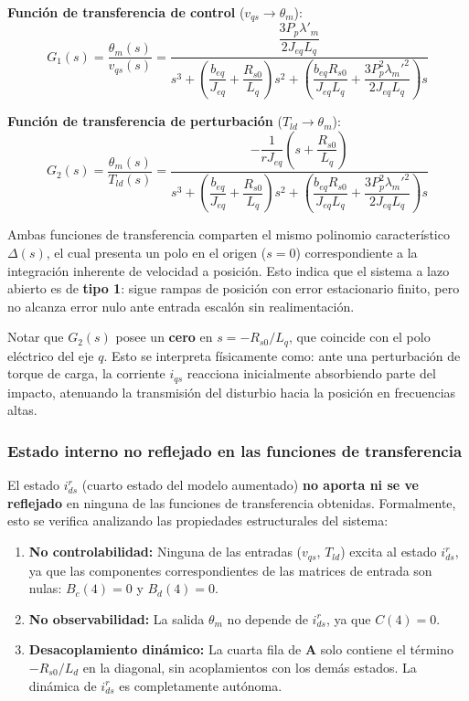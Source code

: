 \documentclass[12pt, a4paper,journal, onecolumn, compsoc]{IEEEtran}
\begin{document}
\vspace{0.3cm}
\textbf{Función de transferencia de control} ($v_{qs} \to \theta_m$):
\begin{equation} \label{eq:tf_vqs}
\boxed{
    G_1(s) = \frac{\theta_m(s)}{v_{qs}(s)} = \frac{\dfrac{3 P_p \lambda'_m}{2 J_{eq} L_q}}{s^3 + \left(\dfrac{b_{eq}}{J_{eq}} + \dfrac{R_{s0}}{L_q}\right)s^2 + \left(\dfrac{b_{eq} R_{s0}}{J_{eq} L_q} + \dfrac{3 P_p^2 \lambda_m'^2}{2 J_{eq} L_q}\right)s}
}
\end{equation}

\vspace{0.3cm}
\textbf{Función de transferencia de perturbación} ($T_{ld} \to \theta_m$):
\begin{equation} \label{eq:tf_Tld}
\boxed{
    G_2(s) = \frac{\theta_m(s)}{T_{ld}(s)} = \frac{-\dfrac{1}{r J_{eq}}\left(s + \dfrac{R_{s0}}{L_q}\right)}{s^3 + \left(\dfrac{b_{eq}}{J_{eq}} + \dfrac{R_{s0}}{L_q}\right)s^2 + \left(\dfrac{b_{eq} R_{s0}}{J_{eq} L_q} + \dfrac{3 P_p^2 \lambda_m'^2}{2 J_{eq} L_q}\right)s}
}
\end{equation}

Ambas funciones de transferencia comparten el mismo polinomio característico $\Delta(s)$, el cual presenta un polo en el origen ($s=0$) correspondiente a la integración inherente de velocidad a posición. Esto indica que el sistema a lazo abierto es de \textbf{tipo 1}: sigue rampas de posición con error estacionario finito, pero no alcanza error nulo ante entrada escalón sin realimentación.

Notar que $G_2(s)$ posee un \textbf{cero} en $s = -R_{s0}/L_q$, que coincide con el polo eléctrico del eje $q$. Esto se interpreta físicamente como: ante una perturbación de torque de carga, la corriente $i_{qs}$ reacciona inicialmente absorbiendo parte del impacto, atenuando la transmisión del disturbio hacia la posición en frecuencias altas.

\subsubsection{Estado interno no reflejado en las funciones de transferencia}
El estado $i_{ds}^r$ (cuarto estado del modelo aumentado) \textbf{no aporta ni se ve reflejado} en ninguna de las funciones de transferencia obtenidas. Formalmente, esto se verifica analizando las propiedades estructurales del sistema:

\begin{enumerate}
    \item \textbf{No controlabilidad:} Ninguna de las entradas ($v_{qs}$, $T_{ld}$) excita al estado $i_{ds}^r$, ya que las componentes correspondientes de las matrices de entrada son nulas: $B_c(4) = 0$ y $B_d(4) = 0$.
    \item \textbf{No observabilidad:} La salida $\theta_m$ no depende de $i_{ds}^r$, ya que $C(4) = 0$.
    \item \textbf{Desacoplamiento dinámico:} La cuarta fila de $\mathbf{A}$ solo contiene el término $-R_{s0}/L_d$ en la diagonal, sin acoplamientos con los demás estados. La dinámica de $i_{ds}^r$ es completamente autónoma.
\end{enumerate}
\end{document}
